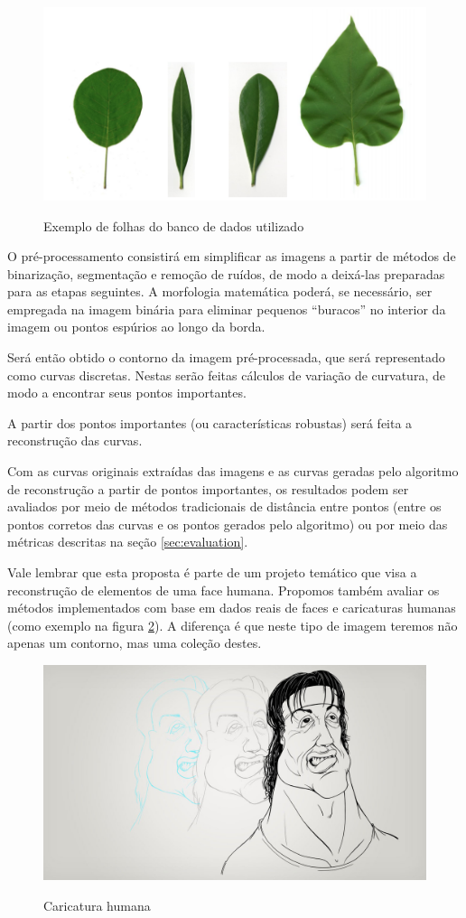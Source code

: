 \documentclass[
	12pt,				%
	oneside,			%
	a4paper,			%
	sumario=tradicional,
	english,			%
	french,				%
	spanish,			%
	brazil,				%
]{abntex2}
\begin{document}
\begin{figure}[htb]
\centering
    \caption{Exemplo de folhas do banco de dados utilizado}
    \includegraphics[width=.5\linewidth]{./img/folhas.png}
    \label{fig:folha}
\end{figure}

O pré-processamento consistirá em simplificar as imagens a partir de métodos de binarização, segmentação e remoção de ruídos, de modo a deixá-las preparadas para as etapas seguintes. A morfologia matemática poderá, se necessário, ser empregada na imagem binária para eliminar pequenos ``buracos'' no interior da imagem ou pontos espúrios ao longo da borda.

Será então obtido o contorno da imagem pré-processada, que será representado como curvas discretas. Nestas serão feitas cálculos de variação de curvatura, de modo a encontrar seus pontos importantes.

A partir dos pontos importantes (ou características robustas) será feita a reconstrução das curvas.


Com as curvas originais extraídas das imagens e as curvas geradas pelo algoritmo de reconstrução a partir de pontos importantes, os resultados podem ser avaliados por meio de métodos tradicionais de distância entre pontos (entre os pontos corretos das curvas e os pontos gerados pelo algoritmo) ou por meio das métricas descritas na seção \ref{sec:evaluation}.

Vale lembrar que esta proposta é parte de um projeto temático que visa a reconstrução de elementos de uma face humana. Propomos também avaliar os métodos implementados com base em dados reais de faces e caricaturas humanas (como exemplo na figura \ref{fig:stallone}). A diferença é que neste tipo de imagem teremos não apenas um contorno, mas uma coleção destes.  

\begin{figure}[htb]
\centering
    \caption{Caricatura humana}
    \includegraphics[width=.5\linewidth]{./img/Stalon.jpg}
    \label{fig:stallone}
\end{figure}
\end{document}
